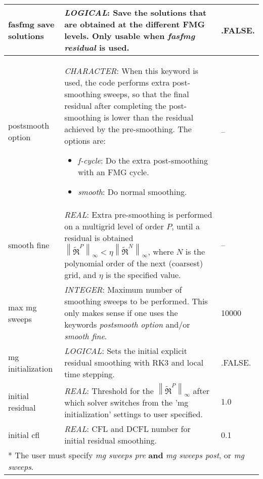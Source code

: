 \documentclass[a4paper,10pt]{report}
\newcommand\norm[1]{\left\lVert#1\right\rVert}
\def\Res{\pmb{\mathfrak{R}}}
\begin{document}
\begin{longtable}{|p{4cm}|p{10cm}|p{2.2cm}|}
fasfmg save solutions & \textit{LOGICAL}: Save the solutions that are obtained at the different FMG levels.
Only usable when \textit{fasfmg residual} is used. 	& .FALSE.	\\ \hline


postsmooth option    & \textit{CHARACTER}: When this keyword is used, the code performs extra post-smoothing sweeps, so that the final residual after completing the post-smoothing is lower than the residual achieved by the pre-smoothing. The options are:\

\begin{itemize}
\item \textit{f-cycle}: Do the extra post-smoothing with an FMG cycle.
\item \textit{smooth}: Do normal smoothing.
\end{itemize}  & -- \\ \hline

smooth fine & \textit{REAL}: Extra pre-smoothing is performed on a multigrid level of order $P$, until a residual is obtained $\norm{\tilde{\Res}^{P}}_{\infty} < \eta \norm{\tilde{\Res}^{N}}_{\infty}$, where $N$ is the polynomial order of the next (coarsest) grid, and $\eta$ is the specified value.	& --	\\ \hline

max mg sweeps & \textit{INTEGER}: Maximum number of smoothing sweeps to be performed. This only makes sense if one uses the keywords \textit{postsmooth option} and/or \textit{smooth fine}.	& 10000	\\ \hline

mg initialization & \textit{LOGICAL}: Sets the initial explicit residual smoothing with RK3 and local time stepping. & .FALSE.	\\ \hline

initial residual & \textit{REAL}: Threshold for the $\norm{\tilde{\Res}^{P}}_{\infty}$ after which solver switches from the 'mg initialization' settings to user specified. & 1.0	\\ \hline

initial cfl & \textit{REAL}: CFL and DCFL number for initial residual smoothing. & 0.1	\\ \hline

\multicolumn{3}{p{16.4cm}}{*  The user must specify \textit{mg sweeps pre} \textbf{and} \textit{mg sweeps post}, or \textit{mg sweeps}.} \\

\end{longtable}
\end{document}
